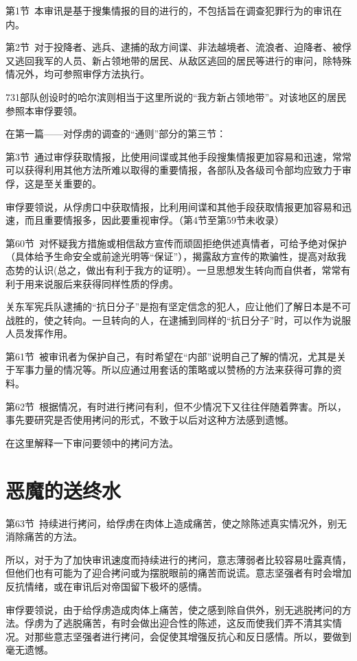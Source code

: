\documentclass[a4paper,12pt,UTF8,twoside]{ctexbook}
\begin{document}
第1节\ 本审讯是基于搜集情报的目的进行的，不包括旨在调查犯罪行为的审讯在内。

第2节\ 对于投降者、逃兵、逮捕的敌方间谍、非法越境者、流浪者、迫降者、被俘又逃回我军的人员、新占领地带的居民、从敌区逃回的居民等进行的审问，除特殊情况外，均可参照审俘方法执行。

731部队创设时的哈尔滨则相当于这里所说的“我方新占领地带”。对该地区的居民参照本审俘要领。

在第一篇——对俘虏的调查的“通则”部分的第三节：

第3节\ 通过审俘获取情报，比使用间谍或其他手段搜集情报更加容易和迅速，常常可以获得利用其他方法所难以取得的重要情报，各部队及各级司令部均应致力于审俘，这是至关重要的。

审俘要领说，从俘虏口中获取情报，比利用间谍和其他手段获取情报更加容易和迅速，而且重要情报多，因此要重视审俘。（第4节至第59节未收录）

第60节\ 对怀疑我方措施或相信敌方宣传而顽固拒绝供述真情者，可给予绝对保护（具体给予生命安全或前途光明等“保证”），揭露敌方宣传的欺骗性，提高对敌我态势的认识(总之，做出有利于我方的证明）。一旦思想发生转向而自供者，常常有利于用来说服后来获得同样性质的俘虏。

关东军宪兵队逮捕的“抗日分子”是抱有坚定信念的犯人，应让他们了解日本是不可战胜的，使之转向。一旦转向的人，在逮捕到同样的“抗日分子”时，可以作为说服人员发挥作用。

第61节\ 被审讯者为保护自己，有时希望在“内部”说明自己了解的情况，尤其是关于军事力量的情况等。所以应通过用套话的策略或以赞杨的方法来获得可靠的资料。

第62节\ 根据情况，有时进行拷问有利，但不少情况下又往往伴随着弊害。所以，事先要研究是否使用拷问的形式，不致于以后对这种方法感到遗憾。

在这里解释一下审问要领中的拷问方法。

\section{恶魔的送终水}

第63节\ 持续进行拷问，给俘虏在肉体上造成痛苦，使之除陈述真实情况外，别无消除痛苦的方法。

所以，对于为了加快审讯速度而持续进行的拷问，意志薄弱者比较容易吐露真情，但他们也有可能为了迎合拷问或为摆脱眼前的痛苦而说谎。意志坚强者有时会增加反抗情绪，或在审讯后对帝国留下极坏的感情。

审俘要领说，由于给俘虏造成肉体上痛苦，使之感到除自供外，别无逃脱拷问的方法。俘虏为了逃脱痛苦，有时会做出迎合性的陈述，这反而使我们弄不清其实情况。对那些意志坚强者进行拷问，会促使其增强反抗心和反日感情。所以，要做到毫无遗憾。
\end{document}
